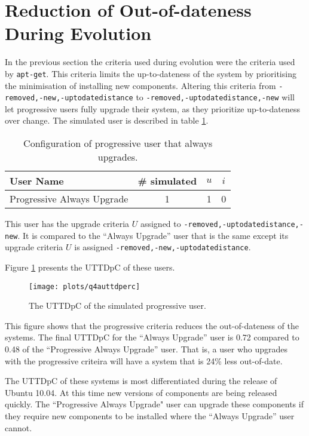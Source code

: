 \section{Reduction of Out-of-dateness During Evolution}
\label{exp.q2}
\label{exp.prouttdsection}
In the previous section the criteria used during evolution were the criteria used by \texttt{apt-get}.
This criteria limits the up-to-dateness of the system by prioritising the minimisation of installing new components.
Altering this criteria from \texttt{-removed,-new,-uptodatedistance} to \texttt{-removed,-uptodatedistance,-new} 
will let progressive users fully upgrade their system, as they prioritize up-to-dateness over change.
The simulated user is described in table \ref{exp.tblq4ausers}.
\begin{table}[h!]
\centering
\begin{tabular}{|l | c | c | c |}
\hline
User Name 								& \# simulated 			& $u$ 		& $i$ 			\\ \hline
Progressive Always Upgrade				& 1 			 	& 1				& 0\\ \hline
\end{tabular}
\caption{Configuration of progressive user that always upgrades.}
\label{exp.tblq4ausers}
\end{table}
This user has the upgrade criteria $U$ assigned to \texttt{-removed,-uptodatedistance,-new}.
It is compared to the ``Always Upgrade'' user that is the same except its upgrade criteria $U$ is assigned \texttt{-removed,-new,-uptodatedistance}.

Figure \ref{exp.q4auttdperc} presents the UTTDpC of these users.
\begin{figure}[htp]
\begin{center}
  \texttt{[image: plots/q4auttdperc]}
  \caption{The UTTDpC of the simulated progressive user.}
  \label{exp.q4auttdperc}
\end{center}
\end{figure}

This figure shows that the progressive criteria reduces the out-of-dateness of the systems.
The final UTTDpC for the ``Always Upgrade'' user is 0.72 compared to 0.48 of the ``Progressive Always Upgrade'' user.
That is, a user who upgrades with the progressive criteira will have a system that is 24\% less out-of-date.

The UTTDpC of these systems is most differentiated during the release of Ubuntu 10.04.
At this time new versions of components are being released quickly.
The ``Progressive Always Upgrade" user can upgrade these components if they require new components to be installed where the ``Always Upgrade'' user cannot.

